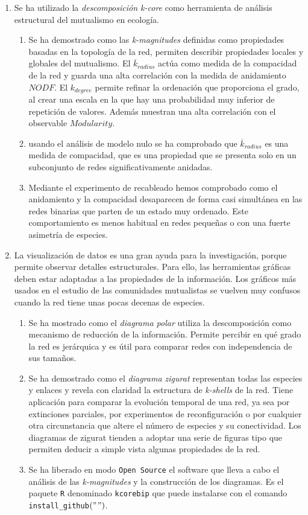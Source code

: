 \begin{enumerate}
\item Se ha utilizado la \textit{descomposición k-core} como herramienta de análisis estructural del mutualismo en ecología. 
	\begin{enumerate}
	\item Se ha demostrado como las \textit{k-magnitudes} definidas como propiedades basadas en la topología de la red, permiten describir propiedades locales y globales del mutualismo. El $\overline {k}_{radius}$ actúa como medida de la compacidad de la red y guarda una alta correlación con la medida de anidamiento $NODF$. El ${k}_{degree}$ permite refinar la ordenación que proporciona el grado, al crear una escala en la que hay una probabilidad muy inferior de repetición de valores. Además muestran una alta correlación con el observable $Modularity$.
	\item usando el análisis de modelo nulo se ha comprobado que $\overline {k}_{radius}$ es una medida de compacidad, que es una propiedad que se presenta solo en un subconjunto de redes significativamente anidadas.
	\item Mediante el experimento de recableado hemos comprobado como el anidamiento y la compacidad desaparecen de forma casi simultánea en las redes binarias que parten de un estado muy ordenado. Este comportamiento es menos habitual en redes pequeñas o con una fuerte asimetría de especies.
	\end{enumerate}

\item La visualización de datos es una gran ayuda para la investigación, porque permite observar detalles estructurales. Para ello, las herramientas gráficas deben estar adaptadas a las propiedades de la información. Los gráficos más usados en el estudio de las comunidades mutualistas se vuelven muy confusos cuando la red tiene unas pocas decenas de especies. 
	\begin{enumerate}
	\item Se ha mostrado como el \textit{diagrama polar} utiliza la descomposición como mecanismo de reducción de la información. Permite percibir en qué grado la red es jerárquica y es útil para comparar redes con independencia de sus tamaños.
	\item Se ha demostrado como el \textit{diagrama zigurat} representan todas las especies y enlaces y revela con claridad la estructura de \textit{k-shells} de la red. Tiene aplicación para comparar la evolución temporal de una red, ya sea por extinciones parciales, por experimentos de reconfiguración o por cualquier otra circunstancia que altere el número de especies y su conectividad. Los diagramas de zigurat tienden a adoptar una serie de figuras tipo que permiten deducir a simple vista algunas propiedades de la red.
	\item Se ha liberado en modo \texttt{Open Source} el software que lleva a cabo el análisis de las \textit{k-magnitudes} y la construcción de los diagramas. Es el paquete \texttt{R} denominado \texttt{kcorebip} que puede instalarse con el comando \texttt{install\_github}$("$$")$.
	\end{enumerate}


\end{enumerate}
